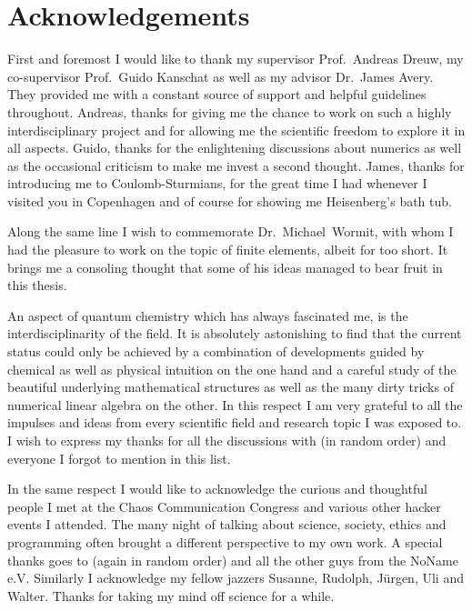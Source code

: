 \chapter*{Acknowledgements} 
{}

First and foremost I would like to thank
my supervisor Prof.~Andreas Dreuw,
my co-supervisor Prof.~Guido Kanschat
as well as my advisor Dr.~James Avery.
They provided me with a constant source of support
and helpful guidelines throughout.
Andreas, thanks for giving me the chance to work on such
a highly interdisciplinary project
and for allowing me the scientific freedom to explore it in all aspects.
Guido, thanks for the enlightening discussions about numerics
as well as the occasional criticism to make me invest a second thought.
James, thanks for introducing me to Coulomb-Sturmians,
for the great time I had whenever I visited you in Copenhagen
and of course for showing me Heisenberg's bath tub.

Along the same line I wish to commemorate Dr.~Michael~Wormit,
with whom I had the pleasure to work on the topic of finite elements,
albeit for too short.
It brings me a consoling thought that some of his
ideas managed to bear fruit in this thesis.


An aspect of quantum chemistry
which has always fascinated me,
is the interdisciplinarity of the field.
It is absolutely astonishing
to find that the current status could only be achieved
by a combination of developments guided by chemical as well as physical intuition
on the one hand
and a careful study of the beautiful underlying mathematical structures
as well as the many dirty tricks of numerical linear algebra on the other.
In this respect I am very grateful
to all the impulses and ideas from
every scientific field and research topic I was exposed to.
I wish to express my thanks for all the discussions with
(in random order)
%
and everyone I forgot to mention in this list.


In the same respect I would like to acknowledge the curious and thoughtful
people I met at the Chaos Communication Congress
and various other hacker events I attended.
The many night of talking
about science, society, ethics and programming often brought a
different perspective to my own work.
A special thanks goes to 
(again in random order)
%
and all the other guys from the NoName e.V.
Similarly I acknowledge my fellow jazzers
Susanne, Rudolph, Jürgen, Uli and Walter.
Thanks for taking my mind off science for a while.

